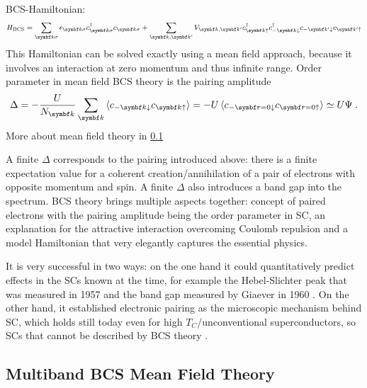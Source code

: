 \documentclass[../notes.tex]{subfiles}
\begin{document}
BCS-Hamiltonian:
\begin{equation}\label{eq:BCS Hamiltonian}
	H_{\text{BCS}} = \sum_{\vb{k}\sigma} \epsilon_{\vb{k}\sigma} c_{\vb{k}\sigma}^{\dagger} c_{\vb{k}\sigma} + \sum_{\vb{k}, \vb{k}^{\prime}} V_{\vb{k}, \vb{k}^{\prime}} c_{\vb{k}\uparrow}^{\dagger} c_{-\vb{k}\downarrow}^{\dagger} c_{-\vb{k}^{\prime}\downarrow} c_{\vb{k}^{\prime}\uparrow}
\end{equation}
This Hamiltonian can be solved exactly using a mean field approach, because it involves an interaction at zero momentum and thus infinite range.
Order parameter in mean field BCS theory is the pairing amplitude
\begin{equation}
	\Delta = - \frac{U}{N_{\vb{k}}} \sum_{\vb{k}} \braket{c_{-\vb{k} \downarrow} c_{\vb{k} \uparrow}} = - U \braket{c_{-\vb{r}=0 \downarrow} c_{\vb{r=0} \uparrow}} \simeq U \Psi \;.
\end{equation}
More about mean field theory in \cref{ssec:Multiband BCS Mean Field Theory}

A finite \(\Delta\) corresponds to the pairing introduced above: there is a finite expectation value for a coherent creation/annihilation of a pair of electrons with opposite momentum and spin.
A finite \(\Delta\) also introduces a band gap into the spectrum.
BCS theory brings multiple aspects together: concept of paired electrons with the pairing amplitude being the order parameter in SC, an explanation for the attractive interaction overcoming Coulomb repulsion and a model Hamiltonian that very elegantly captures the essential physics.

It is very successful in two ways: on the one hand it could quantitatively predict effects in the SCs known at the time, for example the Hebel-Slichter peak that was measured in 1957 \cite{hebelNuclearRelaxationSuperconducting1957, hebelNuclearSpinRelaxation1959} and the band gap measured by Giaever in 1960 \cite{giaeverStudySuperconductorsElectron1961}.  
On the other hand, it established electronic pairing as the microscopic mechanism behind SC, which holds still today even for high \(T_C\)/unconventional superconductors, so SCs that cannot be described by BCS theory \cite{zhouHightemperatureSuperconductivity2021}.


\subsection{Multiband BCS Mean Field Theory}\label{ssec:Multiband BCS Mean Field Theory}
\end{document}
